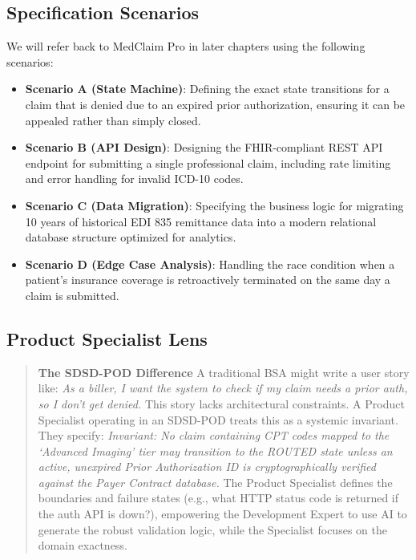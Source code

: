 \subsection{Specification Scenarios}\label{specification-scenarios}

We will refer back to MedClaim Pro in later chapters using the following
scenarios:

\begin{itemize}
\tightlist
\item
  \textbf{Scenario A (State Machine)}: Defining the exact state
  transitions for a claim that is denied due to an expired prior
  authorization, ensuring it can be appealed rather than simply closed.
\item
  \textbf{Scenario B (API Design)}: Designing the FHIR-compliant REST
  API endpoint for submitting a single professional claim, including
  rate limiting and error handling for invalid ICD-10 codes.
\item
  \textbf{Scenario C (Data Migration)}: Specifying the business logic
  for migrating 10 years of historical EDI 835 remittance data into a
  modern relational database structure optimized for analytics.
\item
  \textbf{Scenario D (Edge Case Analysis)}: Handling the race condition
  when a patient's insurance coverage is retroactively terminated on the
  same day a claim is submitted.
\end{itemize}

\subsection{Product Specialist Lens}\label{product-specialist-lens}

\begin{quote}
\textbf{The SDSD-POD Difference} A traditional BSA might write a user
story like: \emph{As a biller, I want the system to check if my claim
needs a prior auth, so I don't get denied.} This story lacks
architectural constraints. A Product Specialist operating in an SDSD-POD
treats this as a systemic invariant. They specify: \emph{Invariant: No
claim containing CPT codes mapped to the `Advanced Imaging' tier may
transition to the ROUTED state unless an active, unexpired Prior
Authorization ID is cryptographically verified against the Payer
Contract database.} The Product Specialist defines the boundaries and
failure states (e.g., what HTTP status code is returned if the auth API
is down?), empowering the Development Expert to use AI to generate the
robust validation logic, while the Specialist focuses on the domain
exactness.
\end{quote}

